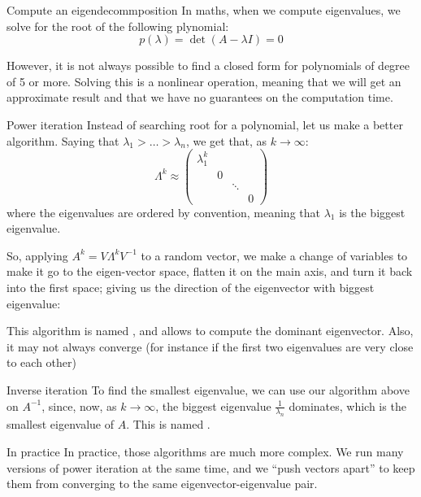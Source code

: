 \documentclass[a4paper]{article}
\begin{document}
\begin{parag}{Compute an eigendecommposition}
    In maths, when we compute eigenvalues, we solve for the root of the following plynomial: 
    \[p\left(\lambda\right) = \det\left(A - \lambda I\right) = 0\]
    
    However, it is not always possible to find a closed form for polynomials of degree of 5 or more. Solving this is a nonlinear operation, meaning that we will get an approximate result and that we have no guarantees on the computation time.

    \begin{subparag}{Power iteration}
        Instead of searching root for a polynomial, let us make a better algorithm. Saying that $\lambda_1 > \ldots > \lambda_n$, we get that, as $k \to \infty$: 
        \[\Lambda^k \approx \begin{pmatrix} \lambda_1^k &  &  &  \\  & 0 &  &  \\  &  & \ddots &  \\  &  &  & 0 \end{pmatrix} \]
        where the eigenvalues are ordered by convention, meaning that $\lambda_1$ is the biggest eigenvalue.

        So, applying $A^k = V \Lambda^k V^{-1}$ to a random vector, we make a change of variables to make it go to the eigen-vector space, flatten it on the main axis, and turn it back into the first space; giving us the direction of the eigenvector with biggest eigenvalue:
        
        This algorithm is named , and allows to compute the dominant eigenvector. Also, it may not always converge (for instance if the first two eigenvalues are very close to each other)
    \end{subparag}
    
    \begin{subparag}{Inverse iteration}
        To find the smallest eigenvalue, we can use our algorithm above on $A^{-1}$, since, now, as $k \to \infty$, the biggest eigenvalue $\frac{1}{\lambda_n}$ dominates, which is the smallest eigenvalue of $A$. This is named .
    \end{subparag}

    \begin{subparag}{In practice}
        In practice, those algorithms are much more complex. We run many versions of power iteration at the same time, and we ``push vectors apart'' to keep them from converging to the same eigenvector-eigenvalue pair.
    \end{subparag}
\end{parag}
\end{document}
